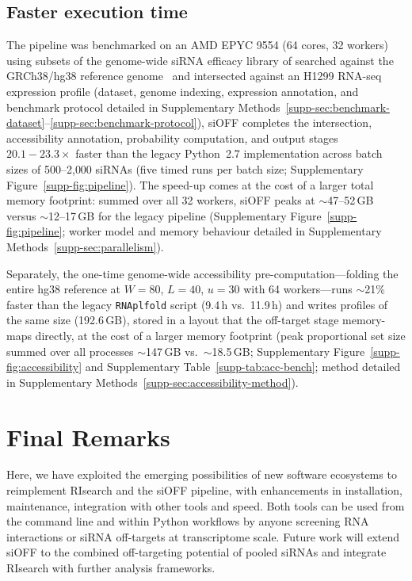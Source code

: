 \documentclass[unnumsec,webpdf,contemporary,large]{oup-authoring-template}
\begin{document}
\subsection*{Faster execution time}
The pipeline was benchmarked on an AMD EPYC 9554 (64 cores, 32 workers) using subsets of the genome-wide siRNA efficacy library of \citet{huesken2005design} searched against the GRCh38/hg38 reference genome~\citep{schneider2017grch38} and intersected against an H1299 RNA-seq expression profile (dataset, genome indexing, expression annotation, and benchmark protocol detailed in Supplementary Methods~\ref*{supp-sec:benchmark-dataset}--\ref*{supp-sec:benchmark-protocol}), siOFF completes the intersection, accessibility annotation, probability computation, and output stages $20.1{-}23.3\times$ faster than the legacy Python~2.7 implementation across batch sizes of 500--2{,}000 siRNAs (five timed runs per batch size; Supplementary Figure~\ref*{supp-fig:pipeline}).
The speed-up comes at the cost of a larger total memory footprint: summed over all 32 workers, siOFF peaks at $\sim$47--52\,GB versus $\sim$12--17\,GB for the legacy pipeline (Supplementary Figure~\ref*{supp-fig:pipeline}; worker model and memory behaviour detailed in Supplementary Methods~\ref*{supp-sec:parallelism}).

Separately, the one-time genome-wide accessibility pre-computation---folding the entire hg38 reference at $W{=}80$, $L{=}40$, $u{=}30$ with 64 workers---runs $\sim$21\% faster than the legacy \texttt{RNAplfold} script (9.4\,h vs.\ 11.9\,h) and writes profiles of the same size (192.6\,GB), stored in a layout that the off-target stage memory-maps directly, at the cost of a larger memory footprint (peak proportional set size summed over all processes $\sim$147\,GB vs.\ $\sim$18.5\,GB; Supplementary Figure~\ref*{supp-fig:accessibility} and Supplementary Table~\ref*{supp-tab:acc-bench}; method detailed in Supplementary Methods~\ref*{supp-sec:accessibility-method}).

\section{Final Remarks}

Here, we have exploited the emerging possibilities of new software ecosystems to reimplement RIsearch and the siOFF pipeline, with enhancements in installation, maintenance, integration with other tools and speed.
Both tools can be used from the command line and within Python workflows by anyone screening RNA interactions or siRNA off-targets at transcriptome scale.
Future work will extend siOFF to the combined off-targeting potential of pooled siRNAs and integrate RIsearch with further analysis frameworks.
\end{document}
